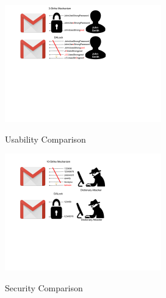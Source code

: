 \begin{figure}[htb]
	\begin{center}
		\includegraphics[height=2in,width=\linewidth]{Figures/Introduction/Usability.pdf}
		\caption{Usability Comparison}\label{figure:introduction_usability}
		\includegraphics[height=2in,width=\linewidth]{Figures/Introduction/Security.pdf}
		\caption{Security Comparison}\label{figure:introduction_security}
	\end{center}
	\vspace{-0.8cm}
\end{figure}




